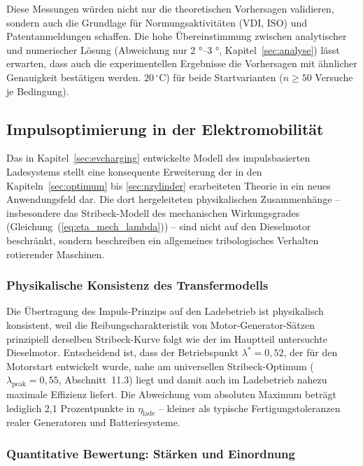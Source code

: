 ﻿\documentclass[a4paper,12pt]{article}
\begin{document}
Diese Messungen würden nicht nur die theoretischen Vorhersagen validieren,
sondern auch die Grundlage für Normungsaktivitäten (VDI, ISO) und
Patentanmeldungen schaffen. Die hohe Übereinstimmung zwischen analytischer
und numerischer Lösung (Abweichung nur 2 °--3 °, Kapitel~\ref{sec:analyse})
lässt erwarten, dass auch die experimentellen Ergebnisse die Vorhersagen
mit ähnlicher Genauigkeit bestätigen werden.
    $20\,^\circ\text{C}$) für beide Startvarianten ($n \geq 50$ Versuche je Bedingung).

\subsection{Impulsoptimierung in der Elektromobilität}

Das in Kapitel~\ref{sec:evcharging} entwickelte Modell des impulsbasierten
Ladesystems stellt eine konsequente Erweiterung der in den Kapiteln~\ref{sec:optimum}
bis \ref{sec:nzylinder} erarbeiteten Theorie in ein neues Anwendungsfeld dar.
Die dort hergeleiteten physikalischen Zusammenhänge -- insbesondere das
Stribeck-Modell des mechanischen Wirkungsgrades
(Gleichung~(\ref{eq:eta_mech_lambda})) -- sind nicht auf den Dieselmotor
beschränkt, sondern beschreiben ein allgemeines tribologisches Verhalten
rotierender Maschinen.

\subsubsection*{Physikalische Konsistenz des Transfermodells}

Die Übertragung des Impuls-Prinzips auf den Ladebetrieb ist physikalisch
konsistent, weil die Reibungscharakteristik von Motor-Generator-Sätzen
prinzipiell derselben Stribeck-Kurve folgt wie der im Hauptteil untersuchte
Dieselmotor. Entscheidend ist, dass der Betriebspunkt $\lambda^* = 0{,}52$,
der für den Motorstart entwickelt wurde, nahe am universellen Stribeck-Optimum
($\lambda_\text{peak} = 0{,}55$, Abschnitt~11.3) liegt und damit auch
im Ladebetrieb nahezu maximale Effizienz liefert. Die Abweichung vom absoluten
Maximum beträgt lediglich 2{,}1 Prozentpunkte in $\eta_\text{lade}$ --
kleiner als typische Fertigungstoleranzen realer Generatoren und Batteriesysteme.

\subsubsection*{Quantitative Bewertung: Stärken und Einordnung}
\end{document}
